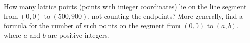 How many lattice points (points with integer coordinates) lie on the line segment from $(0,0)$ to $(500,900)$, not counting the endpoints? More generally, find a formula for the number of such points on the segment from $(0,0)$ to $(a,b)$, where $a$ and $b$ are positive integers.
